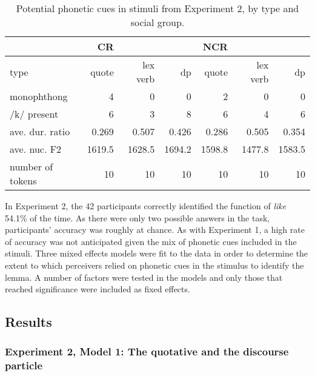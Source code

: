 \begin{table}[ht]
\begin{center}
\begin{tabular}{lrrrrrr}
  \hline
     
   					&	CR	&		&		&	NCR		& 	&	\\
   					\hline
type				&	quote  &  lex verb & dp  \vline&	quote  &  lex verb & dp \\
monophthong &  4  &  0  &  0  \vline&    2	&  0  &  0  \\
/k/ present	&   6  &  3  &  8 \vline&  6  &  4 &  6 \\
ave. dur. ratio & 0.269	& 0.507 & 0.426 \vline& 0.286 &	0.505 &	0.354 \\
ave. nuc. F2 & 1619.5 &	1628.5 &	1694.2 \vline& 1598.8	& 1477.8	& 1583.5  \\
number of tokens			&  10   &  10 & 10 \vline& 10 &  10   &  10 \\
   \hline
   \end{tabular}
\caption{Potential phonetic cues in stimuli from Experiment 2, by type and social group.}\label{tab:cues2}
\end{center}
\end{table} 

In Experiment 2, the 42 participants correctly identified the function of \textit{like} 54.1\% of the time.  As there were only two possible answers in the task, participants' accuracy was roughly at chance.  As with Experiment 1, a high rate of accuracy was not anticipated given the mix of phonetic cues included in the stimuli.  Three mixed effects models were fit to the data in order to determine the extent to which perceivers relied on phonetic cues in the stimulus to identify the lemma.  A number of factors were tested in the models and only those that reached significance were included as fixed effects.

\subsection{Results}

\subsubsection{Experiment 2, Model 1: The quotative and the discourse particle}

